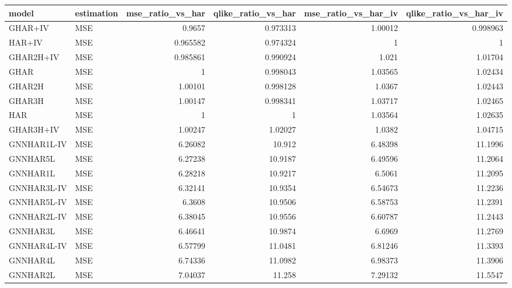 \begin{tabular}{llrrrr}
\toprule
model & estimation & mse_ratio_vs_har & qlike_ratio_vs_har & mse_ratio_vs_har_iv & qlike_ratio_vs_har_iv \\
\midrule
GHAR+IV & MSE & 0.9657 & 0.973313 & 1.00012 & 0.998963 \\
HAR+IV & MSE & 0.965582 & 0.974324 & 1 & 1 \\
GHAR2H+IV & MSE & 0.985861 & 0.990924 & 1.021 & 1.01704 \\
GHAR & MSE & 1 & 0.998043 & 1.03565 & 1.02434 \\
GHAR2H & MSE & 1.00101 & 0.998128 & 1.0367 & 1.02443 \\
GHAR3H & MSE & 1.00147 & 0.998341 & 1.03717 & 1.02465 \\
HAR & MSE & 1 & 1 & 1.03564 & 1.02635 \\
GHAR3H+IV & MSE & 1.00247 & 1.02027 & 1.0382 & 1.04715 \\
GNNHAR1L-IV & MSE & 6.26082 & 10.912 & 6.48398 & 11.1996 \\
GNNHAR5L & MSE & 6.27238 & 10.9187 & 6.49596 & 11.2064 \\
GNNHAR1L & MSE & 6.28218 & 10.9217 & 6.5061 & 11.2095 \\
GNNHAR3L-IV & MSE & 6.32141 & 10.9354 & 6.54673 & 11.2236 \\
GNNHAR5L-IV & MSE & 6.3608 & 10.9506 & 6.58753 & 11.2391 \\
GNNHAR2L-IV & MSE & 6.38045 & 10.9556 & 6.60787 & 11.2443 \\
GNNHAR3L & MSE & 6.46641 & 10.9874 & 6.6969 & 11.2769 \\
GNNHAR4L-IV & MSE & 6.57799 & 11.0481 & 6.81246 & 11.3393 \\
GNNHAR4L & MSE & 6.74336 & 11.0982 & 6.98373 & 11.3906 \\
GNNHAR2L & MSE & 7.04037 & 11.258 & 7.29132 & 11.5547 \\
\bottomrule
\end{tabular}
